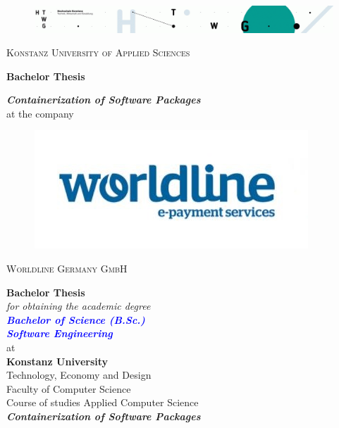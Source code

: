 
\begin{titlepage}
\vspace*{15mm}
\begin{figure}[h]
\centering
\includegraphics[width=\textwidth]{fig/ain}
\label{fig:unilogo}
\end{figure}
{
\center
{\LARGE \textsc{Konstanz University of Applied Sciences}}\\
\vspace*{10mm}

\textbf{{\Large Bachelor Thesis}}\\
\vspace*{40mm}

\textbf{{\Large \textit{Containerization of Software Packages}}}\\ \vspace*{5mm}
{at the company }\\
\begin{figure}[h]
\centering
\includegraphics{fig/wl.jpg}
\label{fig:unilogo}
\end{figure}
\vspace*{10mm}
{\Large \textsc{Worldline Germany GmbH}}

}


\newpage
\thispagestyle{empty}

{
\center
\vspace*{15mm}
{\Huge \textbf{Bachelor Thesis}}\\ \vspace*{5mm}
\emph{for obtaining the academic degree \\ \vspace*{5mm}
{\LARGE \textbf{\textcolor{blue}{Bachelor of Science (B.Sc.) \\ Software Engineering}}} }\\
\vspace*{10mm}
{at}\\
\vspace*{10mm}
{\large \textbf{Konstanz University}}\\ \vspace*{5mm}
{Technology, Economy and Design \\ \vspace*{1mm} Faculty of Computer Science  \\ \vspace*{1mm} 
Course of studies Applied Computer Science}\\ \vspace*{10mm}
{\LARGE \textbf{\textit{Containerization of Software Packages }}} 

}
\end{titlepage}
